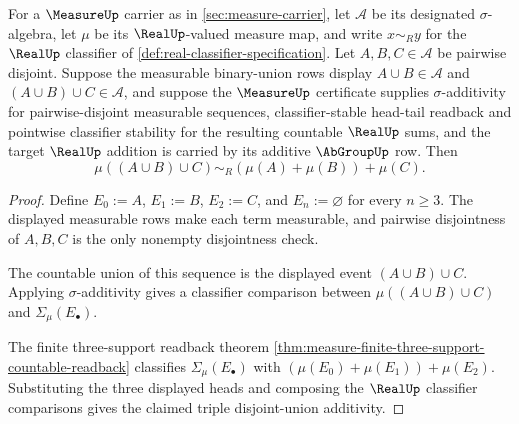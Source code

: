 \begin{theorem}
\label{thm:measure-triple-disjoint-union-additivity}
For a $\MeasureUp$ carrier as in \autoref{sec:measure-carrier}, let $\mathcal{A}$ be its designated $\sigma$-algebra, let $\mu$ be its $\RealUp$-valued measure map, and write $x\sim_R y$ for the $\RealUp$ classifier of \autoref{def:real-classifier-specification}. Let $A,B,C\in\mathcal{A}$ be pairwise disjoint. Suppose the measurable binary-union rows display $A\cup B\in\mathcal{A}$ and $(A\cup B)\cup C\in\mathcal{A}$, and suppose the $\MeasureUp$ certificate supplies $\sigma$-additivity for pairwise-disjoint measurable sequences, classifier-stable head-tail readback and pointwise classifier stability for the resulting countable $\RealUp$ sums, and the target $\RealUp$ addition is carried by its additive $\AbGroupUp$ row. Then
$$
\mu((A\cup B)\cup C)\sim_R(\mu(A)+\mu(B))+\mu(C).
$$
\end{theorem}
\begin{proof}
Define $E_0:=A$, $E_1:=B$, $E_2:=C$, and $E_n:=\varnothing$ for every $n\geq3$. The displayed measurable rows make each term measurable, and pairwise disjointness of $A,B,C$ is the only nonempty disjointness check.

The countable union of this sequence is the displayed event $(A\cup B)\cup C$. Applying $\sigma$-additivity gives a classifier comparison between $\mu((A\cup B)\cup C)$ and $\Sigma_\mu(E_\bullet)$.

The finite three-support readback theorem \autoref{thm:measure-finite-three-support-countable-readback} classifies $\Sigma_\mu(E_\bullet)$ with $(\mu(E_0)+\mu(E_1))+\mu(E_2)$. Substituting the three displayed heads and composing the $\RealUp$ classifier comparisons gives the claimed triple disjoint-union additivity.
\end{proof}

